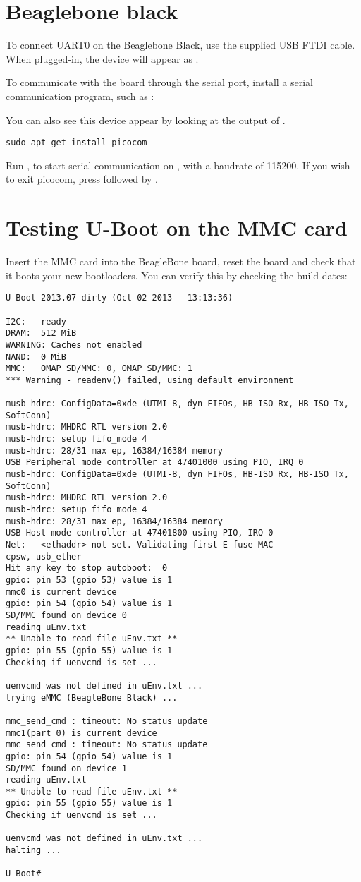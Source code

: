 \section{Beaglebone black}
To connect UART0 on the Beaglebone Black, use the supplied USB FTDI cable.
When plugged-in, the device will appear as .

To communicate with the board through the serial port, install a
serial communication program, such as :

You can also see this device appear by looking at the output of
.

\begin{verbatim}
sudo apt-get install picocom
\end{verbatim}

Run , to start serial
communication on , with a baudrate of 115200. If
you wish to exit picocom, press \code{[Ctrl][a]} followed by
\code{[Ctrl][x]}.

\section{Testing U-Boot on the MMC card}

Insert the MMC card into the BeagleBone board, reset the board and check
that it boots your new bootloaders. You can verify this by checking
the build dates:

\begin{verbatim}
U-Boot 2013.07-dirty (Oct 02 2013 - 13:13:36)

I2C:   ready
DRAM:  512 MiB
WARNING: Caches not enabled
NAND:  0 MiB
MMC:   OMAP SD/MMC: 0, OMAP SD/MMC: 1
*** Warning - readenv() failed, using default environment

musb-hdrc: ConfigData=0xde (UTMI-8, dyn FIFOs, HB-ISO Rx, HB-ISO Tx, SoftConn)
musb-hdrc: MHDRC RTL version 2.0
musb-hdrc: setup fifo_mode 4
musb-hdrc: 28/31 max ep, 16384/16384 memory
USB Peripheral mode controller at 47401000 using PIO, IRQ 0
musb-hdrc: ConfigData=0xde (UTMI-8, dyn FIFOs, HB-ISO Rx, HB-ISO Tx, SoftConn)
musb-hdrc: MHDRC RTL version 2.0
musb-hdrc: setup fifo_mode 4
musb-hdrc: 28/31 max ep, 16384/16384 memory
USB Host mode controller at 47401800 using PIO, IRQ 0
Net:   <ethaddr> not set. Validating first E-fuse MAC
cpsw, usb_ether
Hit any key to stop autoboot:  0
gpio: pin 53 (gpio 53) value is 1
mmc0 is current device
gpio: pin 54 (gpio 54) value is 1
SD/MMC found on device 0
reading uEnv.txt
** Unable to read file uEnv.txt **
gpio: pin 55 (gpio 55) value is 1
Checking if uenvcmd is set ...

uenvcmd was not defined in uEnv.txt ...
trying eMMC (BeagleBone Black) ...

mmc_send_cmd : timeout: No status update
mmc1(part 0) is current device
mmc_send_cmd : timeout: No status update
gpio: pin 54 (gpio 54) value is 1
SD/MMC found on device 1
reading uEnv.txt
** Unable to read file uEnv.txt **
gpio: pin 55 (gpio 55) value is 1
Checking if uenvcmd is set ...

uenvcmd was not defined in uEnv.txt ...
halting ...

U-Boot#
\end{verbatim}

